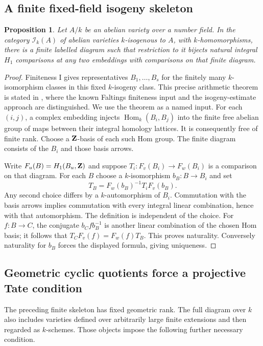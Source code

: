 \documentclass[11pt]{article}
\newtheorem{proposition}[theorem]{Proposition}
\theoremstyle{definition}\newtheorem{definition}[theorem]{Definition}
\theoremstyle{remark}\newtheorem{remark}[theorem]{Remark}
\begin{document}
\subsection{A finite fixed-field isogeny skeleton}
\begin{proposition}\label{prop:isogeny-skeleton}
Let $A/k$ be an abelian variety over a number field. In the category
$\mathcal I_k(A)$ of abelian varieties $k$-isogenous to $A$, with
$k$-homomorphisms, there is a finite labelled diagram such that
restriction to it bijects natural integral $H_1$ comparisons at any
two embeddings with comparisons on that finite diagram.
\end{proposition}
\begin{proof}
Finiteness I gives representatives $B_1,\ldots,B_s$ for the finitely
many $k$-isomorphism classes in this fixed $k$-isogeny class. This
precise arithmetic theorem is stated in
\cite[Introduction, p.~1; see also \S7, pp.~10--11]{MasserWustholzIsogenies},
where the known Faltings finiteness input and the isogeny-estimate
approach are distinguished. We use the theorem as a named input.
For each $(i,j)$, a complex embedding injects $\operatorname{Hom}_k(B_i,B_j)$ into
the finite free abelian group of maps between their integral homology
lattices. It is consequently free of finite rank. Choose a $\mathbf Z$-basis
of each such Hom group. The finite diagram consists of the $B_i$
and those basis arrows.

Write $F_u(B)=H_1(B_u,\mathbf Z)$ and suppose $T_i:F_v(B_i)\to F_w(B_i)$
is a comparison on that diagram. For each $B$ choose a $k$-isomorphism
$b_B:B\to B_i$ and set
\[
             T_B=F_w(b_B)^{-1}T_iF_v(b_B).
\]
Any second choice differs by a $k$-automorphism of $B_i$. Commutation
with the basis arrows implies commutation with every integral linear
combination, hence with that automorphism. The definition is independent
of the choice. For $f:B\to C$, the conjugate $b_Cfb_B^{-1}$ is another
linear combination of the chosen Hom basis; it follows that
$T_CF_v(f)=F_w(f)T_B$. This proves naturality. Conversely naturality
for $b_B$ forces the displayed formula, giving uniqueness.
\end{proof}

\subsection{Geometric cyclic quotients force a projective Tate condition}
The preceding finite skeleton has fixed geometric rank. The full diagram
over $k$ also includes varieties defined over arbitrarily large finite
extensions and then regarded as $k$-schemes. Those objects impose the
following further necessary condition.
\end{document}
